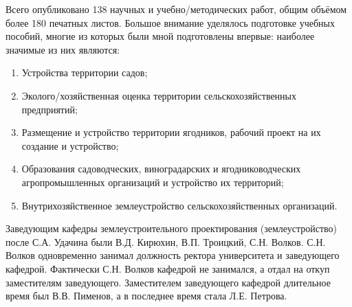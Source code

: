 Всего опубликовано 138 научных и учебно\-/методических работ, общим объёмом более 180 печатных листов. Большое внимание уделялось подготовке учебных пособий, многие из которых были мной подготовлены впервые: наиболее значимые из них являются: 
\begin{enumerate}
	\item Устройства территории садов; 
	\item Эколого\-/хозяйственная оценка территории сельскохозяйственных предприятий; 
	\item Размещение и устройство территории ягодников, рабочий проект на их создание и устройство; 
	\item Образования садоводческих, виноградарских и ягодниководческих агропромышленных организаций и устройство их территорий;
	\item Внутрихозяйственное землеустройство сельскохозяйственных организаций.
\end{enumerate}

Заведующим кафедры землеустроительного проектирования (землеустройство) после С.А. Удачина были В.Д. Кирюхин, В.П. Троицкий, С.Н. Волков. С.Н. Волков одновременно занимал должность ректора университета и заведующего кафедрой. Фактически С.Н. Волков кафедрой не занимался, а отдал на откуп заместителям заведующего. Заместителем заведующего кафедрой длительное время был В.В. Пименов, а в последнее время стала Л.Е. Петрова. 

